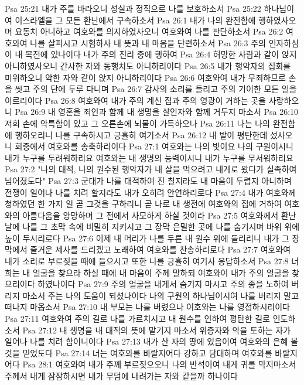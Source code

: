 Psa 25:21  내가 주를 바라오니 성실과 정직으로 나를 보호하소서
Psa 25:22  하나님이여 이스라엘을 그 모든 환난에서 구속하소서
Psa 26:1  내가 나의 완전함에 행하였사오며 요동치 아니하고 여호와를 의지하였사오니 여호와여 나를 판단하소서
Psa 26:2  여호와여 나를 살피시고 시험하사 내 뜻과 내 마음을 단련하소서
Psa 26:3  주의 인자하심이 내 목전에 있나이다 내가 주의 진리 중에 행하여
Psa 26:4  허망한 사람과 같이 앉지 아니하였사오니 간사한 자와 동행치도 아니하리이다
Psa 26:5  내가 행악자의 집회를 미워하오니 악한 자와 같이 앉지 아니하리이다
Psa 26:6  여호와여 내가 무죄하므로 손을 씻고 주의 단에 두루 다니며
Psa 26:7  감사의 소리를 들리고 주의 기이한 모든 일을 이르리이다
Psa 26:8  여호와여 내가 주의 계신 집과 주의 영광이 거하는 곳을 사랑하오니
Psa 26:9  내 영혼을 죄인과 함께 내 생명을 살인자와 함께 거두지 마소서
Psa 26:10  저희 손에 악특함이 있고 그 오른손에 뇌물이 가득하오나
Psa 26:11  나는 나의 완전함에 행하오리니 나를 구속하시고 긍휼히 여기소서
Psa 26:12  내 발이 평탄한데 섰사오니 회중에서 여호와를 송축하리이다
Psa 27:1  여호와는 나의 빛이요 나의 구원이시니 내가 누구를 두려워하리요 여호와는 내 생명의 능력이시니 내가 누구를 무서워하리요
Psa 27:2  "나의 대적, 나의 원수된 행악자가 내 살을 먹으려고 내게로 왔다가 실족하여 넘어졌도다"
Psa 27:3  군대가 나를 대적하여 진 칠지라도 내 마음이 두렵지 아니하며 전쟁이 일어나 나를 치려 할지라도 내가 오히려 안연하리로다
Psa 27:4  내가 여호와께 청하였던 한 가지 일 곧 그것을 구하리니 곧 나로 내 생전에 여호와의 집에 거하여 여호와의 아름다움을 앙망하며 그 전에서 사모하게 하실 것이라
Psa 27:5  여호와께서 환난 날에 나를 그 초막 속에 비밀히 지키시고 그 장막 은밀한 곳에 나를 숨기시며 바위 위에 높이 두시리로다
Psa 27:6  이제 내 머리가 나를 두른 내 원수 위에 들리리니 내가 그 장막에서 즐거운 제사를 드리겠고 노래하여 여호와를 찬송하리로다
Psa 27:7  여호와여 내가 소리로 부르짖을 때에 들으시고 또한 나를 긍휼히 여기사 응답하소서
Psa 27:8  너희는 내 얼굴을 찾으라 하실 때에 내 마음이 주께 말하되 여호와여 내가 주의 얼굴을 찾으리이다 하였나이다
Psa 27:9  주의 얼굴을 내게서 숨기지 마시고 주의 종을 노하여 버리지 마소서 주는 나의 도움이 되셨나이다 나의 구원의 하나님이시여 나를 버리지 말고 떠나지 마옵소서
Psa 27:10  내 부모는 나를 버렸으나 여호와는 나를 영접하시리이다
Psa 27:11  여호와여 주의 길로 나를 가르치시고 내 원수를 인하여 평탄한 길로 인도하소서
Psa 27:12  내 생명을 내 대적의 뜻에 맡기지 마소서 위증자와 악을 토하는 자가 일어나 나를 치려 함이니이다
Psa 27:13  내가 산 자의 땅에 있음이여 여호와의 은혜 볼 것을 믿었도다
Psa 27:14  너는 여호와를 바랄지어다 강하고 담대하며 여호와를 바랄지어다
Psa 28:1  여호와여 내가 주께 부르짖으오니 나의 반석이여 내게 귀를 막지마소서 주께서 내게 잠잠하시면 내가 무덤에 내려가는 자와 같을까 하나이다
